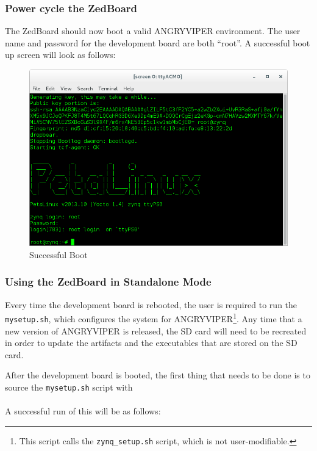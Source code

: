 \subsubsection*{Power cycle the ZedBoard}
The ZedBoard should now boot a valid ANGRYVIPER environment.  The user name and password for the development board are both ``root''.  A successful boot up screen will look as follows:
\begin{figure}[H]
	\centerline{\includegraphics[scale=0.5]{zed_boot}}
	\caption{Successful Boot}
	\label{fig:boot2}
\end{figure}
\newpage
\subsubsection*{Using the ZedBoard in Standalone Mode}
\begin{flushleft}
Every time the development board is rebooted, the user is required to run the \texttt{mysetup.sh}, which configures the system for ANGRYVIPER\footnote{This script calls the \texttt{zynq\_setup.sh} script, which is not user-modifiable.}. Any time that a new version of ANGRYVIPER is released, the SD card will need to be recreated in order to update the artifacts and the executables that are stored on the SD card.
\end{flushleft}
\begin{flushleft}
After the development board is booted, the first thing that needs to be done is to source the \texttt{mysetup.sh} script with\\
\leavevmode{\parindent=3em\indent}\\
A successful run of this will be as follows:
\end{flushleft}



